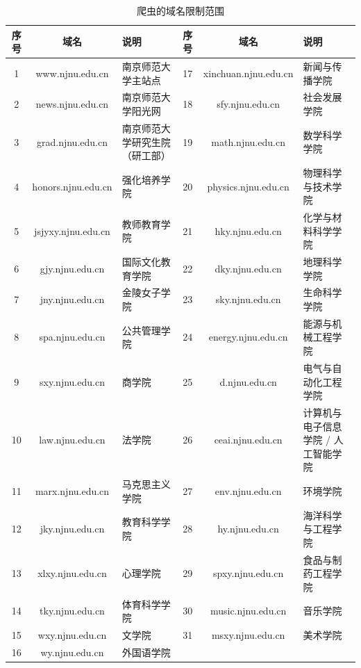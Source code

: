 \documentclass{ctexart}
\begin{document}
    \begin{table}[h]
        \centering
        \caption{爬虫的域名限制范围}
        \label{tab:crawl_domains}
        \scriptsize{
            \begin{tabular}{ccl|ccl}
                \hline
                序号 & 域名                 & 说明              & 序号 & 域名                   & 说明                  \\ \hline
                1  & www.njnu.edu.cn    & 南京师范大学主站点       & 17 & xinchuan.njnu.edu.cn & 新闻与传播学院             \\
                2  & news.njnu.edu.cn   & 南京师范大学阳光网       & 18 & sfy.njnu.edu.cn      & 社会发展学院              \\
                3  & grad.njnu.edu.cn   & 南京师范大学研究生院（研工部） & 19 & math.njnu.edu.cn     & 数学科学学院              \\
                4  & honors.njnu.edu.cn & 强化培养学院          & 20 & physics.njnu.edu.cn  & 物理科学与技术学院           \\
                5  & jsjyxy.njnu.edu.cn & 教师教育学院          & 21 & hky.njnu.edu.cn      & 化学与材料科学学院           \\
                6  & gjy.njnu.edu.cn    & 国际文化教育学院        & 22 & dky.njnu.edu.cn      & 地理科学学院              \\
                7  & jny.njnu.edu.cn    & 金陵女子学院          & 23 & sky.njnu.edu.cn      & 生命科学学院              \\
                8  & spa.njnu.edu.cn    & 公共管理学院          & 24 & energy.njnu.edu.cn   & 能源与机械工程学院           \\
                9  & sxy.njnu.edu.cn    & 商学院             & 25 & d.njnu.edu.cn        & 电气与自动化工程学院          \\
                10 & law.njnu.edu.cn    & 法学院             & 26 & ceai.njnu.edu.cn     & 计算机与电子信息学院 / 人工智能学院 \\
                11 & marx.njnu.edu.cn   & 马克思主义学院         & 27 & env.njnu.edu.cn      & 环境学院                \\
                12 & jky.njnu.edu.cn    & 教育科学学院          & 28 & hy.njnu.edu.cn       & 海洋科学与工程学院           \\
                13 & xlxy.njnu.edu.cn   & 心理学院            & 29 & spxy.njnu.edu.cn     & 食品与制药工程学院           \\
                14 & tky.njnu.edu.cn    & 体育科学学院          & 30 & music.njnu.edu.cn    & 音乐学院                \\
                15 & wxy.njnu.edu.cn    & 文学院             & 31 & msxy.njnu.edu.cn     & 美术学院                \\
                16 & wy.njnu.edu.cn     & 外国语学院           &    &                      &                     \\ \hline
            \end{tabular}
        }
    \end{table}
\end{document}

